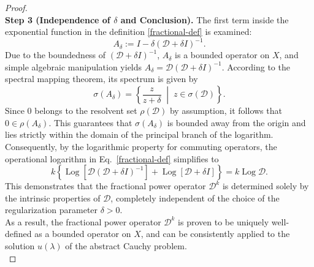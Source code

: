 \documentclass[10pt,a4paper]{amsart}
\begin{document}
\begin{proof}
\vspace{2mm}\\
\noindent\textbf{Step 3 (Independence of $\delta$ and Conclusion).} 
The first term inside the exponential function in the definition \eqref{fractional-def} is examined:
\[ A_\delta := I - \delta (\mathcal{D} + \delta I)^{-1}.\]
Due to the boundedness of $(\mathcal{D} + \delta I)^{-1}$, $A_\delta$ is a bounded operator on $X$, and simple algebraic manipulation yields $A_\delta = \mathcal{D}(\mathcal{D} + \delta I)^{-1}$. 
According to the spectral mapping theorem, its spectrum is given by
\[
\sigma(A_\delta) = \left\{ \frac{z}{z + \delta} \;\middle|\; z \in \sigma(\mathcal{D}) \right\}.
\]
Since $0$ belongs to the resolvent set $\rho(\mathcal{D})$ by assumption, it follows that $0 \in \rho(A_\delta)$. 
This guarantees that $\sigma(A_\delta)$ is bounded away from the origin and lies strictly within the domain of the principal branch of the logarithm. 
Consequently, by the logarithmic property for commuting operators, the operational logarithm in Eq.~\eqref{fractional-def} simplifies to
\[ 
k \left\{ \operatorname{Log} \left[ \mathcal{D}(\mathcal{D} + \delta I)^{-1} \right] + \operatorname{Log} [\mathcal{D} + \delta I] \right\} = k \operatorname{Log} \mathcal{D}. 
\]
This demonstrates that the fractional power operator $\mathcal{D}^k$ is determined solely by the intrinsic properties of $\mathcal{D}$, completely independent of the choice of the regularization parameter $\delta > 0$. \vspace{2mm} \\
As a result, the fractional power operator $\mathcal{D}^k$ is proven to be uniquely well-defined as a bounded operator on $X$, and can be consistently applied to the solution $u(\lambda)$ of the abstract Cauchy problem.\vspace{2mm}\\
\end{proof}
\end{document}
